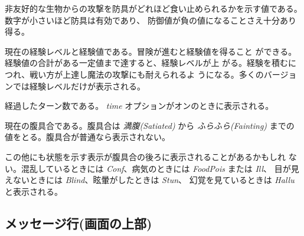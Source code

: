 非友好的な生物からの攻撃を防具がどれほど食い止められるかを示す値である。
数字が小さいほど防具は有効であり、
防御値が負の値になることさえ十分あり得る。
\item[\bb{経験値(Experience)}]
現在の経験レベルと経験値である。冒険が進むと経験値を得ること
ができる。経験値の合計がある一定値まで達すると、経験レベルが上
がる。経験を積むにつれ、戦い方が上達し魔法の攻撃にも耐えられるよ
うになる。多くのバージョンでは経験レベルだけが表示される。
\item[\bb{時間(Time)}]
経過したターン数である。
{\it time\/}
オプションがオンのときに表示される。
\item[\bb{腹具合(Hunger status)}]
現在の腹具合である。腹具合は {\it 満腹(Satiated)} から
{\it ふらふら(Fainting) } までの値をとる。腹具合が普通なら表示されない。

この他にも状態を示す表示が腹具合の後ろに表示されることがあるかもしれ
ない。混乱しているときには {\it Conf\/}、病気のときには {\it FoodPois\/}
または {\it Ill\/}、
目が見えないときには {\it Blind\/}、眩暈がしたときは {\it Stun\/}、
幻覚を見ているときは {\it Hallu\/} と表示される。
\elist

\subsection*{メッセージ行(画面の上部)}

